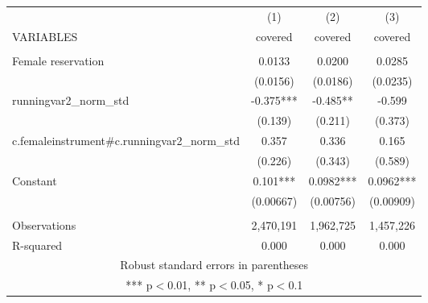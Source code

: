 \begin{tabular}{lccc} \hline
 & (1) & (2) & (3) \\
VARIABLES & covered & covered & covered \\ \hline
 &  &  &  \\
Female reservation & 0.0133 & 0.0200 & 0.0285 \\
 & (0.0156) & (0.0186) & (0.0235) \\
runningvar2\_norm\_std & -0.375*** & -0.485** & -0.599 \\
 & (0.139) & (0.211) & (0.373) \\
c.femaleinstrument\#c.runningvar2\_norm\_std & 0.357 & 0.336 & 0.165 \\
 & (0.226) & (0.343) & (0.589) \\
Constant & 0.101*** & 0.0982*** & 0.0962*** \\
 & (0.00667) & (0.00756) & (0.00909) \\
 &  &  &  \\
Observations & 2,470,191 & 1,962,725 & 1,457,226 \\
 R-squared & 0.000 & 0.000 & 0.000 \\ \hline
\multicolumn{4}{c}{ Robust standard errors in parentheses} \\
\multicolumn{4}{c}{ *** p$<$0.01, ** p$<$0.05, * p$<$0.1} \\
\end{tabular}
